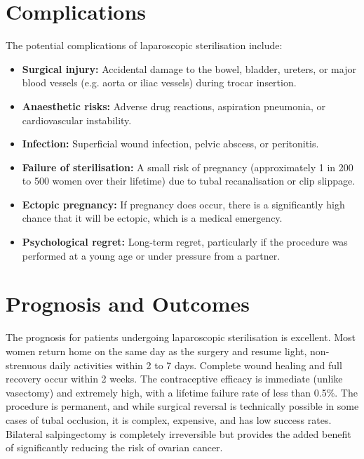 \section*{Complications}
The potential complications of laparoscopic sterilisation include:
\begin{itemize}
    \item \textbf{Surgical injury:} Accidental damage to the bowel, bladder, ureters, or major blood vessels (e.g. aorta or iliac vessels) during trocar insertion.
    \item \textbf{Anaesthetic risks:} Adverse drug reactions, aspiration pneumonia, or cardiovascular instability.
    \item \textbf{Infection:} Superficial wound infection, pelvic abscess, or peritonitis.
    \item \textbf{Failure of sterilisation:} A small risk of pregnancy (approximately 1 in 200 to 500 women over their lifetime) due to tubal recanalisation or clip slippage.
    \item \textbf{Ectopic pregnancy:} If pregnancy does occur, there is a significantly high chance that it will be ectopic, which is a medical emergency.
    \item \textbf{Psychological regret:} Long-term regret, particularly if the procedure was performed at a young age or under pressure from a partner.
\end{itemize}

\section*{Prognosis and Outcomes}
The prognosis for patients undergoing laparoscopic sterilisation is excellent. Most women return home on the same day as the surgery and resume light, non-strenuous daily activities within 2 to 7 days. Complete wound healing and full recovery occur within 2 weeks. The contraceptive efficacy is immediate (unlike vasectomy) and extremely high, with a lifetime failure rate of less than 0.5\%. The procedure is permanent, and while surgical reversal is technically possible in some cases of tubal occlusion, it is complex, expensive, and has low success rates. Bilateral salpingectomy is completely irreversible but provides the added benefit of significantly reducing the risk of ovarian cancer.

